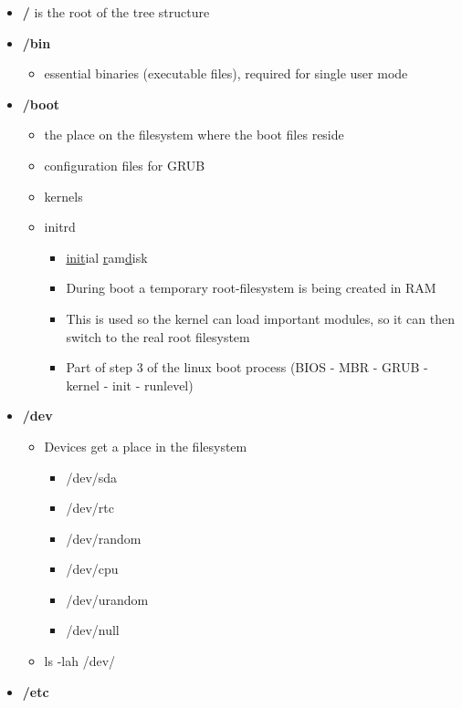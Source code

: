 \documentclass{article}
\begin{document}
\begin{itemize}
    \item \textbf{/} is the root of the tree structure
    \item \textbf{/bin}
    \begin{itemize}
        \item essential binaries (executable files), required for single user mode
    \end{itemize}
    \item \textbf{/boot}
    \begin{itemize}
        \item the place on the filesystem where the boot files reside
        \item configuration files for GRUB
        \item kernels
        \item initrd
        \begin{itemize}
            \item \underline{init}ial \underline{r}am\underline{d}isk
            \item During boot a temporary root-filesystem is being created in RAM
            \item This is used so the kernel can load important modules, so it can then switch to the real root filesystem
            \item Part of step 3 of the linux boot process (BIOS - MBR - GRUB - kernel - init - runlevel)
        \end{itemize}
    \end{itemize}
    \item \textbf{/dev}
    \begin{itemize}
        \item Devices get a place in the filesystem
        \begin{itemize}
            \item /dev/sda
            \item /dev/rtc
            \item /dev/random
            \item /dev/cpu
            \item /dev/urandom
            \item /dev/null
        \end{itemize}
        \item ls -lah /dev/
    \end{itemize}
    \item \textbf{/etc}
    \begin{itemize}

\end{itemize}
\end{itemize}
\end{document}
